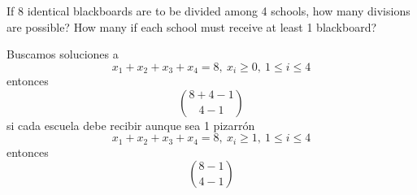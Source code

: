\item If 8 identical blackboards are to be divided among 4 schools, how many divisions are possible? How many if each school must receive at least 1 blackboard?

Buscamos soluciones a
\[ x_1 + x_2 + x_3 + x_4 = 8,\ x_i \ge 0,\ 1 \le i \le 4 \]
entonces
\[ \binom{8+4-1}{4-1} \]
si cada escuela debe recibir aunque sea 1 pizarrón
\[ x_1 + x_2 + x_3 + x_4 = 8,\ x_i \ge 1,\ 1 \le i \le 4 \]
entonces
\[ \binom{8-1}{4-1} \]